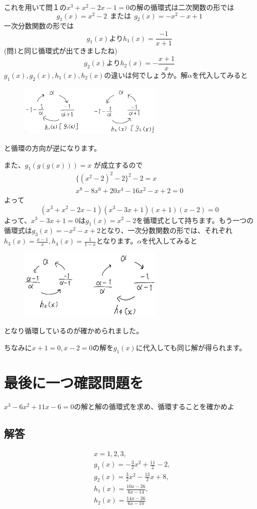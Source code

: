 これを用いて問１の$x^3+x^2-2x-1 = 0$の解の循環式は二次関数の形では
\[
g_1(x) = x^2 -2\ \ または\ \ g_2(x) = -x^2-x+1
\]
一次分数関数の形では
\[
g_1(x)よりh_1(x) =\frac{-1}{x+1}
\]
(問1と同じ循環式が出てきましたね)
\[
g_2(x)よりh_2(x)=-\frac{x+1}{x}
\]
$g_1(x),g_2(x),h_1(x),h_2(x)$の違いは何でしょうか。解$\alpha$を代入してみると
\begin{figure}[H]
  \centering
  \includegraphics[width=7cm]{tuzi/image/5}
\end{figure}\noindent
と循環の方向が逆になります。\par
また、$g_1(g(g(x))) = x$ が成立するので
\begin{align*}
  \{(x^2-2)^2-2\}^2-2 = x\\
  x^8-8x^6+20x^4-16x^2-x+2 = 0
\end{align*}
よって
\[
(x^3+x^2-2x-1)(x^3-3x+1)(x+1)(x-2) = 0
\]
よって、$x^3-3x+1 = 0$は$g_1(x) = x^2-2$を循環式として持ちます。もう一つの循環式は$g_3(x)=-x^2-x+2$となり、一次分数関数の形では、それぞれ$h_3(x) = \frac{x-1}{x},h_4(x) = \frac{1}{1-x}$となります。$\alpha$を代入してみると
\begin{figure}[H]
  \centering
  \includegraphics[width=7cm]{tuzi/image/6}
\end{figure}\noindent
となり循環しているのが確かめられました。\par
ちなみに$x+1 = 0,x-2=0$の解を$g_1(x)$に代入しても同じ解が得られます。

%
\section*{最後に一つ確認問題を}
\begin{screen}
  $x^3-6x^2+11x-6 = 0$の解と解の循環式を求め、循環することを確かめよ
\end{screen}
%
\subsection*{解答}\vspace{-3zw}
\begin{align*}
  & x= 1,2,3,\\
  & g_1(x)=-\frac{3}{2}x^2+\frac{11}{2}-2,\\
  & g_2(x) =\frac{3}{2}x^2-\frac{13}{2}x+8,\\
  & h_1(x)=\frac{10x-26}{6x-14},\\
  & h_2(x) = \frac{14x-26}{6x-10}
\end{align*}

